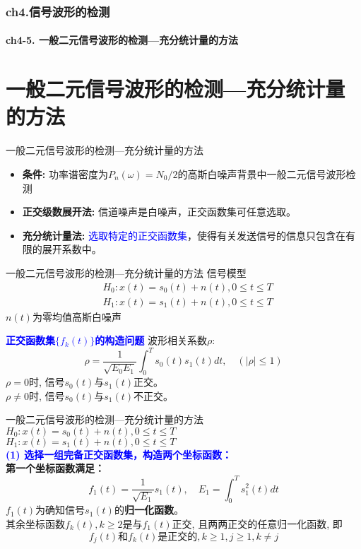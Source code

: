 \begin{frame}[shrink]
  \frametitle{ch4.信号波形的检测}
  \framesubtitle{ch4-5. 一般二元信号波形的检测---充分统计量的方法}
  \tableofcontents[hideallsubsections]
\end{frame}

\section{一般二元信号波形的检测---充分统计量的方法}

\begin{frame}{一般二元信号波形的检测---充分统计量的方法}
\begin{itemize}
	\setlength{\itemsep}{.5cm}
	\item \textbf{条件: }功率谱密度为$P_n(\omega)=N_0/2$的高斯白噪声背景中一般二元信号波形检测
	\item \textbf{正交级数展开法: }信道噪声是白噪声，正交函数集可任意选取。
	\item \textbf{充分统计量法: }\textcolor{blue}{选取特定的正交函数集}，使得有关发送信号的信息只包含在有限的展开系数中。	
\end{itemize}
\end{frame}

\begin{frame}{一般二元信号波形的检测---充分统计量的方法}
信号模型
\begin{align*}
&H_0: x(t)=s_0(t)+n(t), 0\le t\le T\\
&H_1: x(t)=s_1(t)+n(t), 0\le t\le T
\end{align*}
$n(t)$为零均值高斯白噪声
\begin{block}{\textbf{\textcolor{blue}{正交函数集$\{f_k(t)\}$的构造问题}}}
波形相关系数$\rho$:
\[ \rho=\frac{1}{\sqrt{E_{0}E_{1}}}\int_{0}^{T}s_0(t)s_1(t)dt,\quad(|\rho|\le 1) \]
$\rho =0$时, 信号$s_0(t)$与$s_1(t)$正交。\\
$\rho\ne 0$时, 信号$s_0(t)$与$s_1(t)$不正交。	
\end{block}
\end{frame}

\begin{frame}{一般二元信号波形的检测---充分统计量的方法}
$H_0: x(t)=s_0(t)+n(t), 0\le t\le T$\\
$H_1: x(t)=s_1(t)+n(t), 0\le t\le T$\\
\textbf{\textcolor{blue}{(1) 选择一组完备正交函数集，构造两个坐标函数：}}\\
\textbf{第一个坐标函数满足：}\\
\[f_1(t)=\frac{1}{\sqrt{E_1}}s_1(t), \quad E_1=\int_{0}^{T}s_1^2(t)dt\]
$f_1(t)$为确知信号$s_1(t)$的\textbf{归一化函数}。\\
其余坐标函数$f_k(t), k\ge 2$是与$f_1(t)$正交, 且两两正交的任意归一化函数, 即
\[f_j(t)\text{和}f_k(t)\text{是正交的}, k\ge 1, j\ge 1, k\ne j \]
\end{frame}

